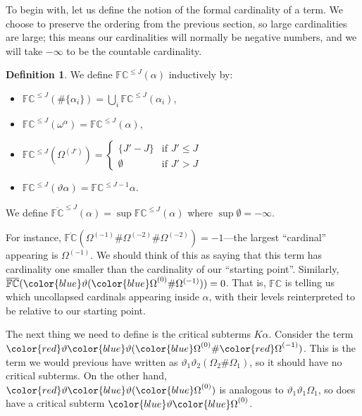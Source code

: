 \documentclass[11pt]{amsart}
\theoremstyle{definition}
\newtheorem{definition}[theorem]{Definition}
\begin{document}
To begin with, let us define the notion of the formal cardinality of a term. We choose to preserve the ordering from the previous section, so large cardinalities are large; this means our cardinalities will normally be negative numbers, and we will take $-\infty$ to be the countable cardinality.
\begin{definition}
  We define $\mathbb{FC}^{\leq J}(\alpha)$ inductively by:
  \begin{itemize}
  \item $\mathbb{FC}^{\leq J}(\#\{\alpha_i\})=\bigcup_i\mathbb{FC}^{\leq J}(\alpha_i)$,
  \item $\mathbb{FC}^{\leq J}(\omega^\alpha)=\mathbb{FC}^{\leq J}(\alpha)$,
  \item $\mathbb{FC}^{\leq J}(\Omega^{(J')})=\left\{\begin{array}{ll}
                                                     \{J'-J\}&\text{if }J'\leq J\\
                                                      \emptyset&\text{if }J'>J
                                                    \end{array}\right.$
  \item $\mathbb{FC}^{\leq J}(\vartheta\alpha)=\mathbb{FC}^{\leq J-1}\alpha$.
  \end{itemize}

  We define $\overline{\mathbb{FC}}^{\leq J}(\alpha)=\sup\mathbb{FC}^{\leq J}(\alpha)$ where $\sup\emptyset=-\infty$. %
\end{definition}
For instance, $\overline{\mathbb{FC}}(\Omega^{(-1)}\#\Omega^{(-2)}\#\Omega^{(-2)})=-1$---the largest ``cardinal'' appearing is $\Omega^{(-1)}$. We should think of this as saying that this term has cardinality one smaller than the cardinality of our ``starting point''. Similarly, $\overline{\mathbb{FC}}({\color{blue}\vartheta}({\color{blue}\Omega}^{(0)}\#\Omega^{(-1)}))=0$. That is, $\mathbb{FC}$ is telling us which uncollapsed cardinals appearing inside $\alpha$, with their levels reinterpreted to be relative to our starting point.

The next thing we need to define is the critical subterms $K\alpha$. Consider the term ${\color{red}\vartheta}{\color{blue}\vartheta}({\color{blue}\Omega}^{(0)}\#{\color{red}\Omega}^{(-1)})$. This is the term we would previous have written as $\vartheta_1\vartheta_2(\Omega_2\#\Omega_1)$, so it should have no critical subterms. On the other hand, ${\color{red}\vartheta}{\color{blue}\vartheta}({\color{blue}\Omega}^{(0)})$ is analogous to $\vartheta_1\vartheta_1\Omega_1$, so does have a critical subterm ${\color{blue}\vartheta}{\color{blue}\Omega}^{(0)}$.
\end{document}
